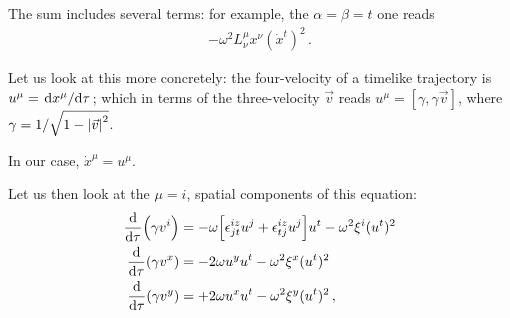 \documentclass[main.tex]{subfiles}
\begin{document}
\begin{extracontent}
The sum includes several terms: for example, the \(\alpha = \beta = t\) one reads 
%
\begin{align}
- \omega^2 L^{\mu }_{\nu } x^{\nu } (\dot{x}^{t} )^2
\,.
\end{align}

Let us look at this more concretely: the four-velocity of a timelike trajectory is \(u^{\mu } = \dv*{x^{\mu }}{\tau }\); which in terms of the three-velocity \(\vec{v}\) reads \(u^{\mu } = [\gamma , \gamma \vec{v}]\), where \(\gamma = 1 / \sqrt{1 - \abs{\vec{v}}^2}\). 

In our case, \(\dot{x}^{\mu } = u^{\mu }\). 

Let us then look at the \(\mu = i\), spatial components of this equation: 
%
\begin{align}
\dv{}{\tau } \qty(\gamma v^{i}) &=
- \omega \qty[
    \epsilon^{iz}_{jt} u^{j}
    + \epsilon^{iz}_{tj} u^{j}
    ] u^{t} 
- \omega^2 \xi^{i}
(u^{t})^2  \\
\dv{}{\tau } \qty(\gamma v^{x} ) &= - 2\omega u^{y} u^{t} - \omega^2 \xi^{x} (u^{t})^2 \\
\dv{}{\tau } \qty(\gamma v^{y} ) &= + 2\omega u^{x} u^{t} - \omega^2 \xi^{y} (u^{t})^2 
\,,
\end{align}
%

\end{extracontent}
\end{document}
